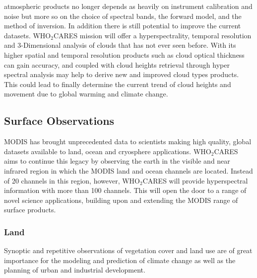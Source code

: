 \documentclass{scrartcl}
\newcommand{\whocares}{WHO$_2$CARES }
\begin{document}
atmospheric products no longer depends as heavily on instrument calibration and
noise but more so on the choice of spectral bands, the forward model, and the
method of inversion. In addition there is still potential to improve the current
datasets. \whocares mission will offer a hyperspectrality, temporal resolution
and 3-Dimensional analysis of clouds that has not ever seen before. With its
higher spatial and temporal resolution products such as cloud optical thickness
can gain accuracy, and coupled with cloud heights retrieval through hyper
spectral analysis may help to derive new and improved cloud types products. This
could lead to finally determine the current trend of cloud heights and movement
due to global warming and climate change.


\subsection{Surface Observations}
\label{sec:org147f3dd}


MODIS has brought unprecedented data to scientists making
high quality, global datasets available to land, ocean and cryosphere
applications. \whocares aims to continue this legacy by observing the earth
in the visible and near infrared region in which the MODIS land and ocean
channels are located. Instead of 20 channels in this region, however,
\whocares will provide hyperspectral information with more than 100 channels.
This will open the door to a range of novel science applications, building upon
and extending the MODIS range of surface products.

\subsubsection{Land}
\label{sec:org188f852}

Synoptic and repetitive observations of vegetation cover and land use are
of great importance for the modeling and prediction of climate change as
well as the planning of urban and industrial development.
\end{document}
